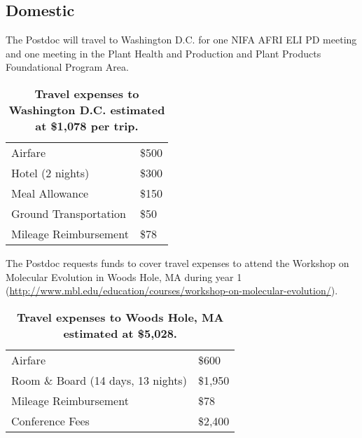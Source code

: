 \documentclass[12pt,letterpaper]{article}
\begin{document}
\subsection{Domestic}

The Postdoc will travel to Washington D.C. for one NIFA AFRI ELI PD meeting and one meeting in the Plant Health and Production and Plant Products Foundational Program Area. 





\begin{table}[h!]
\centering
\begin{tabular}{ll}
\hline

	Airfare	& \$500 \\
	Hotel (2 nights) 	& \$300  \\
	Meal Allowance 	& \$150  \\
	Ground Transportation 	  & \$50 \\
	Mileage Reimbursement	& \$78 \\\hline
\end{tabular}
\caption{\textbf{Travel expenses to Washington D.C. estimated at \$1,078 per trip.}}
\end{table}

The Postdoc requests funds to cover travel expenses to attend the Workshop on Molecular Evolution in Woods Hole, MA during year 1\\
(\url{http://www.mbl.edu/education/courses/workshop-on-molecular-evolution/}).




\begin{table}[h!]
\centering
\begin{tabular}{ll}
\hline

	Airfare	& \$600 \\
	Room \& Board (14 days, 13 nights)	& \$1,950 \\
	Mileage Reimbursement	& \$78 \\
	Conference Fees			& \$2,400 \\\hline
\end{tabular}
\caption{\textbf{Travel expenses to Woods Hole, MA estimated at \$5,028.}}
\end{table}

\newpage
\end{document}
